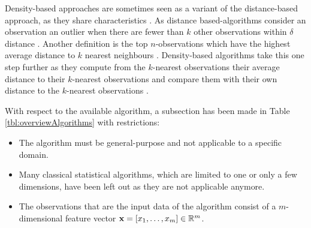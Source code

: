 Density-based approaches are sometimes seen as a variant of the distance-based approach, as they share characteristics \cite{Kriegel:2008:AOD:1401890.1401946}. As distance based-algorithms consider an observation an outlier when there are fewer than $k$ other observations within $\delta$ distance  \cite{Knorr:1999:FIK:645925.671529,Knorr:2000:DOA:764212.764218}. Another definition is the top $n$-observations which have the highest average distance to $k$ nearest neighbours \cite{fastoutlier,Eskin02ageometric}. Density-based algorithms take this one step further as they compute from the $k$-nearest observations their average distance to their $k$-nearest observations and compare them with their own distance to the $k$-nearest observations \cite{Schubert:2014:LOD:2560809.2560914}.

With respect to the available algorithm, a subsection has been made in Table \ref{tbl:overviewAlgorithms} with restrictions:
\begin{itemize}
  \item The algorithm must be general-purpose and not applicable to a specific domain.
  \item Many classical statistical algorithms, which are limited to one or only a few dimensions, \cite{overviewsurvey} have been left out as they are not applicable anymore.
  \item The observations that are the input data of the algorithm consist of a $m$-dimensional feature vector ${\bf x}=[x_{1},\ldots,x_{m}] \in \mathbb{R}^{m}$.
\end{itemize}


